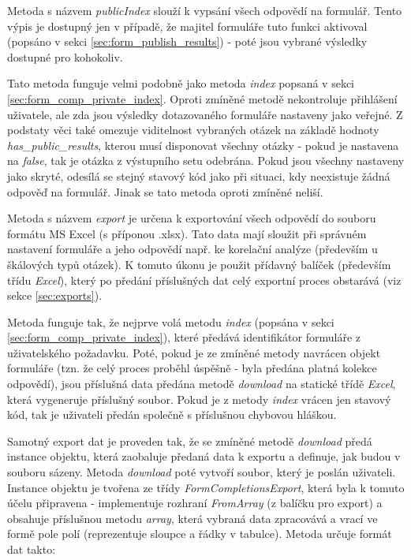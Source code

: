 			Metoda s názvem \textit{publicIndex} slouží k vypsání všech odpovědí na formulář. Tento výpis je dostupný jen v případě, že majitel formuláře tuto funkci aktivoval (popsáno v sekci \ref{sec:form_publish_results}) - poté jsou vybrané výsledky dostupné pro kohokoliv. 
			
			Tato metoda funguje velmi podobně jako metoda \textit{index} popsaná v sekci \ref{sec:form_comp_private_index}. Oproti zmíněné metodě nekontroluje přihlášení uživatele, ale zda jsou výsledky dotazovaného formuláře nastaveny jako veřejné. Z podstaty věci také omezuje viditelnost vybraných otázek na základě hodnoty \textit{has\_public\_results}, kterou musí disponovat všechny otázky - pokud je nastavena na \textit{false}, tak je otázka z výstupního setu odebrána. Pokud jsou všechny nastaveny jako skryté, odesílá se stejný stavový kód jako při situaci, kdy neexistuje žádná odpověď na formulář. Jinak se tato metoda oproti zmíněné neliší.
			
			\label{sec:form_comp_export}
			Metoda s názvem \textit{export} je určena k exportování všech odpovědí do souboru formátu MS Excel (s příponou .xlsx). Tato data mají sloužit při správném nastavení formuláře a jeho odpovědí např. ke korelační analýze (především u škálových typů otázek). K tomuto úkonu je použit přídavný balíček  (především třídu \textit{Excel}), který po předání příslušných dat celý exportní proces obstarává (viz sekce \ref{sec:exports}).
			
			Metoda funguje tak, že nejprve volá metodu \textit{index} (popsána v sekci \ref{sec:form_comp_private_index}), které předává identifikátor formuláře z uživatelského požadavku. Poté, pokud je ze zmíněné metody navrácen objekt formuláře (tzn. že celý proces proběhl úspěšně - byla předána platná kolekce odpovědí), jsou příslušná data předána metodě \textit{download} na statické třídě \textit{Excel}, která vygeneruje příslušný soubor. Pokud je z metody \textit{index} vrácen jen stavový kód, tak je uživateli předán společně s příslušnou chybovou hláškou.
			
			Samotný export dat je proveden tak, že se zmíněné metodě \textit{download} předá instance objektu, která zaobaluje předaná data k exportu a definuje, jak budou v souboru sázeny. Metoda \textit{download} poté vytvoří soubor, který je poslán uživateli. Instance objektu je tvořena ze třídy \textit{FormCompletionsExport}, která byla k tomuto účelu připravena - implementuje rozhraní \textit{FromArray} (z balíčku pro export) a obsahuje příslušnou metodu \textit{array}, která vybraná data zpracovává a vrací ve formě pole polí (reprezentuje sloupce a řádky v tabulce). Metoda určuje formát dat takto:
			
